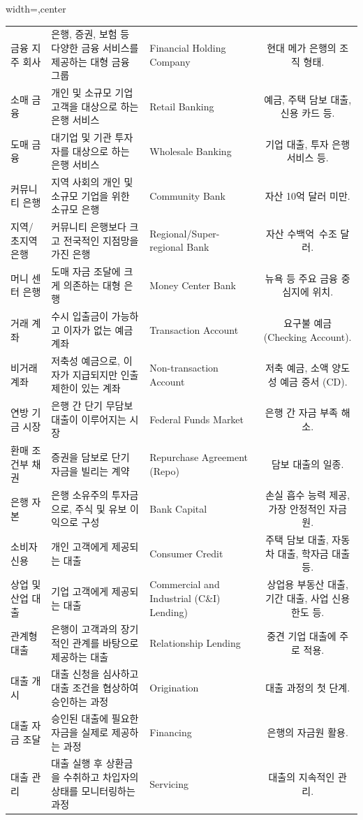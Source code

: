 \documentclass[11pt,a4paper]{article}
\theoremstyle{definition}
\begin{document}
\begin{adjustbox}{width=\textwidth,center}
\begin{tabular}{lllc}
금융 지주 회사 & 은행, 증권, 보험 등 다양한 금융 서비스를 제공하는 대형 금융 그룹 & Financial Holding Company & 현대 메가 은행의 조직 형태. \\
소매 금융 & 개인 및 소규모 기업 고객을 대상으로 하는 은행 서비스 & Retail Banking & 예금, 주택 담보 대출, 신용 카드 등. \\
도매 금융 & 대기업 및 기관 투자자를 대상으로 하는 은행 서비스 & Wholesale Banking & 기업 대출, 투자 은행 서비스 등. \\
커뮤니티 은행 & 지역 사회의 개인 및 소규모 기업을 위한 소규모 은행 & Community Bank & 자산 10억 달러 미만. \\
지역/초지역 은행 & 커뮤니티 은행보다 크고 전국적인 지점망을 가진 은행 & Regional/Super-regional Bank & 자산 수백억~수조 달러. \\
머니 센터 은행 & 도매 자금 조달에 크게 의존하는 대형 은행 & Money Center Bank & 뉴욕 등 주요 금융 중심지에 위치. \\
거래 계좌 & 수시 입출금이 가능하고 이자가 없는 예금 계좌 & Transaction Account & 요구불 예금 (Checking Account). \\
비거래 계좌 & 저축성 예금으로, 이자가 지급되지만 인출 제한이 있는 계좌 & Non-transaction Account & 저축 예금, 소액 양도성 예금 증서 (CD). \\
연방 기금 시장 & 은행 간 단기 무담보 대출이 이루어지는 시장 & Federal Funds Market & 은행 간 자금 부족 해소. \\
환매 조건부 채권 & 증권을 담보로 단기 자금을 빌리는 계약 & Repurchase Agreement (Repo) & 담보 대출의 일종. \\
은행 자본 & 은행 소유주의 투자금으로, 주식 및 유보 이익으로 구성 & Bank Capital & 손실 흡수 능력 제공, 가장 안정적인 자금원. \\
소비자 신용 & 개인 고객에게 제공되는 대출 & Consumer Credit & 주택 담보 대출, 자동차 대출, 학자금 대출 등. \\
상업 및 산업 대출 & 기업 고객에게 제공되는 대출 & Commercial and Industrial (C\&I) Lending) & 상업용 부동산 대출, 기간 대출, 사업 신용 한도 등. \\
관계형 대출 & 은행이 고객과의 장기적인 관계를 바탕으로 제공하는 대출 & Relationship Lending & 중견 기업 대출에 주로 적용. \\
대출 개시 & 대출 신청을 심사하고 대출 조건을 협상하여 승인하는 과정 & Origination & 대출 과정의 첫 단계. \\
대출 자금 조달 & 승인된 대출에 필요한 자금을 실제로 제공하는 과정 & Financing & 은행의 자금원 활용. \\
대출 관리 & 대출 실행 후 상환금을 수취하고 차입자의 상태를 모니터링하는 과정 & Servicing & 대출의 지속적인 관리. \\

\end{tabular}
\end{adjustbox}
\end{document}
